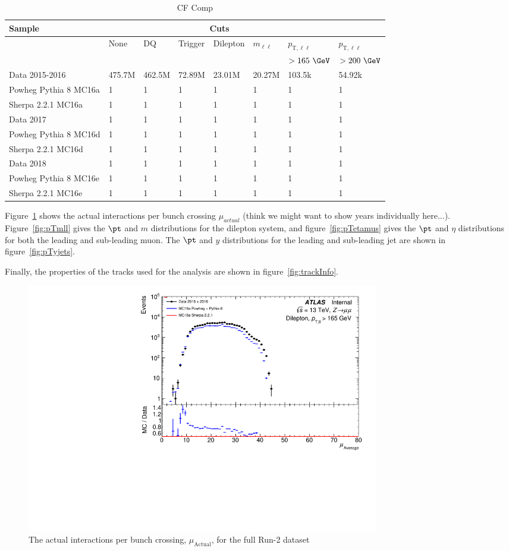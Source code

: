 \begin{table}[h!]
    \centering
    \begin{tabular}{l|l|l|l|l|l|l|l}
    \hline
    \textbf{Sample} & \multicolumn{6}{c}{\textbf{Cuts}} \\ \hline
     & None & DQ & Trigger & Dilepton & $m_{\ell\ell}$ & $p_{\text{T},\ell\ell}$ & $p_{\text{T},\ell\ell}$ \\
     &  &  &  &  &  & $>165~\GeV$ & $>200~\GeV$ \\ \hline\hline
    Data 2015-2016 & 475.7M & 462.5M & 72.89M & 23.01M & 20.27M & 103.5k & 54.92k \\ \hline
    Powheg Pythia 8 MC16a & 1 & 1 & 1 & 1 & 1 & 1 & 1 \\ \hline
    Sherpa 2.2.1 MC16a & 1 & 1 & 1 & 1 & 1 & 1 & 1 \\ \hline\hline
    Data 2017 & 1 & 1 & 1 & 1 & 1 & 1 & 1 \\ \hline
    Powheg Pythia 8 MC16d & 1 & 1 & 1 & 1 & 1 & 1 & 1 \\ \hline
    Sherpa 2.2.1 MC16d & 1 & 1 & 1 & 1 & 1 & 1 & 1\\ \hline\hline
    Data 2018 & 1 & 1 & 1 & 1 & 1 & 1 & 1\\ \hline
    Powheg Pythia 8 MC16e & 1 & 1 & 1 & 1 & 1 & 1 & 1 \\ \hline
    Sherpa 2.2.1 MC16e & 1 & 1 & 1 & 1 & 1 & 1 & 1\\ \hline\hline
    \end{tabular}
    \caption{CF Comp}
    \label{tab:CFComp}
\end{table}

Figure~\ref{fig:MuActual} shows the actual interactions per bunch crossing $\mu_{actual}$ (think we might want to show years individually here...).
Figure~\ref{fig:pTmll} gives the $\pt$ and $m$ distributions for the dilepton system, and figure~\ref{fig:pTetamus} gives the $\pt$ and $\eta$ distributions for both the leading and sub-leading muon.
The $\pt$ and $y$ distributions for the leading and sub-leading jet are shown in figure~\ref{fig:pTyjets}.

Finally, the properties of the tracks used for the analysis are shown in figure~\ref{fig:trackInfo}.

\begin{figure}[h!]
  \centering
  \includegraphics[page=68,width=0.75\textwidth]{figures/ZjetOmnifoldMCDataComp.pdf}
  \caption{The actual interactions per bunch crossing, $\mu_{\text{Actual}}$, for the full Run-2 dataset}
  \label{fig:MuActual}
\end{figure}

